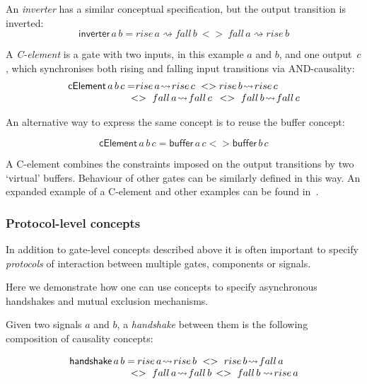 \documentclass[british,conference,compsoc]{IEEEtran}
\begin{document}
\noindent An \emph{inverter} has a similar conceptual specification, but the
output transition is inverted:
\[
\mathsf{inverter}\,a\,b=rise\,a\rightsquigarrow fall\,b\ <>\
fall\,a\rightsquigarrow rise\,b
\]

\noindent A \emph{C-element} is a gate with two inputs, in this example $a$ and $b$, and one
output~$c$, which synchronises both rising and falling input transitions
via AND-causality:
\[
\begin{array}{lcl}
\mathsf{cElement}\,a\, b\, c=&\hspace{-10mm}rise\,a\!\rightsquigarrow\! 
	rise\,c\ <> rise\,b\!\rightsquigarrow\! rise\,c\ \\
&\hspace{-5mm}<>\ fall\,a\!\rightsquigarrow\! fall\,c\ \,
	<>\ fall\,b\!\rightsquigarrow\! fall\,c
\end{array}
\]

An alternative way to express the same concept is to reuse the buffer concept:

\[
\mathsf{cElement}\,a\, b\, c=\mathsf{buffer}\,a\, c <> \mathsf{buffer}\,b\, c
\]

A C-element combines the constraints imposed on the output
transitions by two `virtual' buffers. Behaviour of other gates can be similarly
defined in this way. An expanded example of a C-element and other examples can 
be found in~\cite{2015_Beaumont_MEMOCODE}.

\subsubsection{Protocol-level concepts} In addition to gate-level concepts
described above it is often important to specify \emph{protocols}
of interaction between multiple gates, components or signals. 

Here we demonstrate how one can use concepts to specify asynchronous handshakes
and mutual exclusion mechanisms.

Given two signals $a$ and $b$, a \emph{handshake} between them is
the following composition of causality concepts:

\[
\begin{array}{lcl}
\mathsf{handshake}\,a\, b=&\hspace{-8mm}rise\,a\!\rightsquigarrow\! rise\,b\ 
	<>\ rise\,b\!\rightsquigarrow\! fall\,a \\
&\hspace{-5mm}<>\ fall\,a\!\rightsquigarrow\! fall\,b \, 
	<>\ fall\,b \rightsquigarrow\! rise\,a
\end{array}
\]
\end{document}
